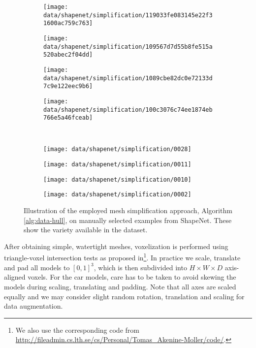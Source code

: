 \begin{figure}
  \centering
  \hspace*{-0.25cm}
  \begin{subfigure}[t]{0.24\textwidth}
    \texttt{[image: data/shapenet/simplification/119033fe083145e22f31600ac759c763]}
  \end{subfigure}\hfill
  \begin{subfigure}[t]{0.24\textwidth}
    \texttt{[image: data/shapenet/simplification/109567d7d55b8fe515a520abec2f04dd]}
  \end{subfigure}\hfill
  \begin{subfigure}[t]{0.24\textwidth}
    \texttt{[image: data/shapenet/simplification/1089cbe82dc0e72133d7c9e122eec9b6]}
  \end{subfigure}\hfill
  \begin{subfigure}[t]{0.24\textwidth}
    \texttt{[image: data/shapenet/simplification/100c3076c74ee1874eb766e5a46fceab]}
  \end{subfigure} \\ 
  
  \begin{subfigure}[t]{0.24\textwidth}
    \texttt{[image: data/shapenet/simplification/0028]}
  \end{subfigure}\hfill
  \begin{subfigure}[t]{0.24\textwidth}
    \texttt{[image: data/shapenet/simplification/0011]}
  \end{subfigure}\hfill
  \begin{subfigure}[t]{0.24\textwidth}
    \texttt{[image: data/shapenet/simplification/0010]}
  \end{subfigure}\hfill
  \begin{subfigure}[t]{0.24\textwidth}
    \texttt{[image: data/shapenet/simplification/0002]}
  \end{subfigure}
  
  \caption{Illustration of the employed mesh simplification approach, \ie
  Algorithm \ref{alg:data-hull}, on manually selected examples from ShapeNet.
  These show the variety available in the dataset.}
  \label{fig:data-simplification}
\end{figure}

After obtaining simple, watertight meshes, voxelization is performed using
triangle-voxel intersection tests as \eg proposed in\cite{AkenineMoeller:2001}\footnote{
  We also use the corresponding code from \url{http://fileadmin.cs.lth.se/cs/Personal/Tomas_Akenine-Moller/code/}.
}. In practice we scale, translate and pad all models to $[0,1]^3$,
which is then subdivided into $H \times W \times D$ axis-aligned voxels.
For the car models, care has to be taken to avoid skewing the models during
scaling, translating and padding. Note that all axes are scaled equally and we may
consider slight random rotation, translation and scaling for data augmentation.

